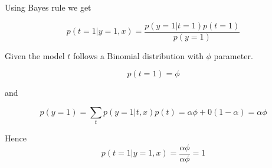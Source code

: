 \begin{answer}
  Using Bayes rule we get

  \begin{equation}
    p(t=1|y=1, x) = \dfrac{p(y=1|t=1)p(t=1)}{p(y=1)}
  \end{equation}

Given the model $t$ follows a Binomial distribution with $\phi$ parameter.

\begin{equation}
  p(t=1) = \phi
\end{equation}

and 

\begin{equation}
  p(y=1) =  \sum_t p(y=1|t, x) p(t) = \alpha \phi + 0(1-\alpha) = \alpha \phi
\end{equation}

Hence
\begin{equation}
  p(t=1|y=1,x) = \dfrac{\alpha \phi}{\alpha \phi} = 1
\end{equation}
\end{answer}
